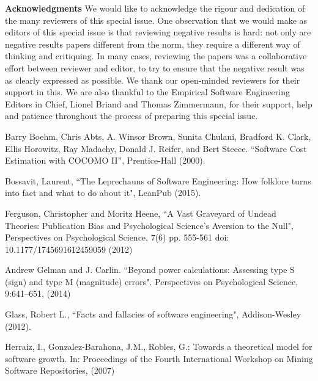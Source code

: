 \documentclass{svjour3}                     %
\begin{document}
\noindent\textbf{Acknowledgments} We would like to acknowledge the rigour and dedication of the many reviewers of this special issue. One observation that we would make as editors of this special issue is that reviewing negative results is hard: not only are negative results papers different from the norm, they require a different way of thinking and critiquing. In many cases, reviewing the papers was a collaborative effort between reviewer and editor, to try to ensure that the negative result was as clearly expressed as possible. We thank our open-minded reviewers for their support in this. We are also thankful to the Empirical Software Engineering Editors in Chief, Lionel Briand and Thomas Zimmermann, for their support, help and patience throughout the process of preparing this special issue.

\begin{thebibliography}{}

  Barry Boehm, Chris Abts, A. Winsor Brown, Sunita Chulani, Bradford K. Clark, Ellis Horowitz, Ray Madachy, Donald J. Reifer, and Bert Steece. ``Software Cost Estimation with COCOMO II'', Prentice-Hall (2000).

 Bossavit, Laurent, ``The Leprechauns of Software Engineering: How folklore turns into fact and what to do about it", LeanPub (2015).

 Ferguson, Christopher and Moritz Heene, ``A Vast Graveyard of Undead Theories: Publication Bias and Psychological Science's Aversion to the Null",  Perspectives on Psychological Science, 7(6) pp. 555-561 doi: 10.1177/1745691612459059 (2012)

 Andrew Gelman and J. Carlin. ``Beyond power calculations: Assessing type S (sign) and type M (magnitude) errors". Perspectives on Psychological Science, 9:641–651, (2014)

 Glass, Robert L., ``Facts and fallacies of software engineering", Addison-Wesley (2012).

 Herraiz, I., Gonzalez-Barahona, J.M., Robles, G.: Towards a theoretical model for software growth. In: Proceedings of the
Fourth International Workshop on Mining Software Repositories,  (2007)



\end{thebibliography}
\end{document}
